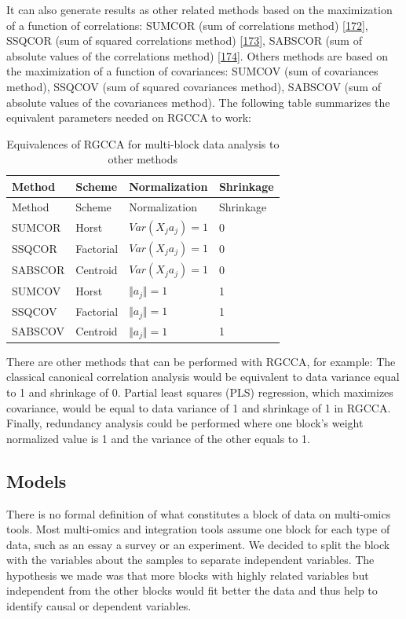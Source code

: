 \documentclass[
  a4paper,
]{book}
\begin{document}
It can also generate results as other related methods based on the maximization of a function of correlations: SUMCOR (sum of correlations method) {[}\protect\hyperlink{ref-horst1961}{172}{]}, SSQCOR (sum of squared correlations method) {[}\protect\hyperlink{ref-kettenring1971}{173}{]}, SABSCOR (sum of absolute values of the correlations method) {[}\protect\hyperlink{ref-vandegeer1984}{174}{]}.
Others methods are based on the maximization of a function of covariances: SUMCOV (sum of covariances method), SSQCOV (sum of squared covariances method), SABSCOV (sum of absolute values of the covariances method).
The following table summarizes the equivalent parameters needed on RGCCA to work:

\begin{longtable}[]{@{}llll@{}}
\caption{\label{tab:RGCCA-methods} Equivalences of RGCCA for multi-block data analysis to other methods}\tabularnewline
\toprule
Method & Scheme & Normalization & Shrinkage \\
\midrule
\endfirsthead
\toprule
Method & Scheme & Normalization & Shrinkage \\
\midrule
\endhead
SUMCOR & Horst & \(Var(X_j a_j) = 1\) & 0 \\
SSQCOR & Factorial & \(Var(X_j a_j) = 1\) & 0 \\
SABSCOR & Centroid & \(Var(X_j a_j) = 1\) & 0 \\
SUMCOV & Horst & \(\Vert a_j \Vert = 1\) & 1 \\
SSQCOV & Factorial & \(\Vert a_j \Vert = 1\) & 1 \\
SABSCOV & Centroid & \(\Vert a_j \Vert = 1\) & 1 \\
\bottomrule
\end{longtable}

There are other methods that can be performed with RGCCA, for example: The classical canonical correlation analysis would be equivalent to data variance equal to 1 and shrinkage of 0.
Partial least squares (PLS) regression, which maximizes covariance, would be equal to data variance of 1 and shrinkage of 1 in RGCCA. Finally, redundancy analysis could be performed where one block's weight normalized value is 1 and the variance of the other equals to 1.

\hypertarget{models}{%
\subsection{Models}\label{models}}

There is no formal definition of what constitutes a block of data on multi-omics tools.
Most multi-omics and integration tools assume one block for each type of data, such as an essay a survey or an experiment.
We decided to split the block with the variables about the samples to separate independent variables.
The hypothesis we made was that more blocks with highly related variables but independent from the other blocks would fit better the data and thus help to identify causal or dependent variables.
\end{document}

